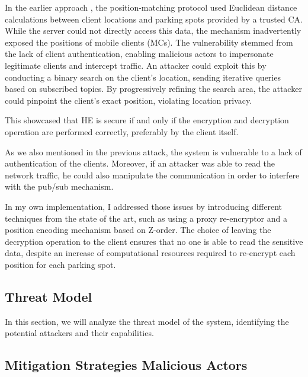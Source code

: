 In the earlier approach \cite{genova2024helamqtt}, the position-matching protocol used Euclidean distance calculations between client locations and parking spots provided by a trusted CA. While the server could not directly access this data, the mechanism inadvertently exposed the positions of mobile clients (MCs). The vulnerability stemmed from the lack of client authentication, enabling malicious actors to impersonate legitimate clients and intercept traffic. An attacker could exploit this by conducting a binary search on the client’s location, sending iterative queries based on subscribed topics. By progressively refining the search area, the attacker could pinpoint the client’s exact position, violating location privacy.

This showcased that HE is secure if and only if the encryption and decryption operation are performed correctly, preferably by the client itself.

As we also mentioned in the previous attack, the system is vulnerable to a lack of authentication of the clients. Moreover, if an attacker was able to read the network traffic, he could also manipulate the communication in order to interfere with the pub/sub mechanism.

In my own implementation, I addressed those issues by introducing different techniques from the state of the art, such as using a proxy re-encryptor and a position encoding mechanism based on Z-order. The choice of leaving the decryption operation to the client ensures that no one is able to read the sensitive data, despite an increase of computational resources required to re-encrypt each position for each parking spot.

\subsection{Threat Model} \label{subsec:threatmodel}

In this section, we will analyze the threat model of the system, identifying the potential attackers and their capabilities. 


\subsection{Mitigation Strategies Malicious Actors}

